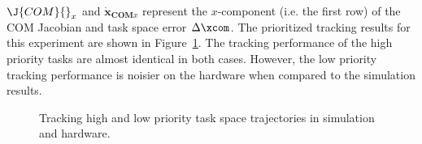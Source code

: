 $\J{COM}{}_x$ and $\dot{\mathbf{x}}_{\textbf{COM}x}$ represent the $x$-component (i.e. the first row) of the COM Jacobian and task space error $\Delta \xcom$. The prioritized tracking results for this experiment are shown in Figure~\ref{fig:prioritizedtracking}. The tracking performance of the high priority tasks are almost identical in both cases. However, the low priority tracking performance is noisier on the hardware when compared to the simulation results. 

\begin{figure}[!t]
	\begin{center}
	\end{center}
  	\caption{Tracking high and low priority task space trajectories in simulation and hardware.}
	\label{fig:prioritizedtracking}
\end{figure} 

